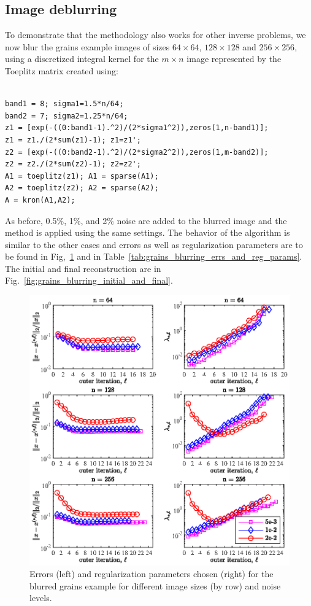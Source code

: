 \subsection{Image deblurring}
To demonstrate that the methodology also works for other inverse problems, we now blur the grains example images of sizes $64 \times 64$, $128 \times 128$ and $256 \times 256$, using a discretized integral kernel for the $m \times n$ image represented by the Toeplitz matrix created using:
\begin{verbatim}

band1 = 8; sigma1=1.5*n/64; 
band2 = 7; sigma2=1.25*n/64;
z1 = [exp(-((0:band1-1).^2)/(2*sigma1^2)),zeros(1,n-band1)];
z1 = z1./(2*sum(z1)-1); z1=z1';
z2 = [exp(-((0:band2-1).^2)/(2*sigma2^2)),zeros(1,m-band2)];
z2 = z2./(2*sum(z2)-1); z2=z2';
A1 = toeplitz(z1); A1 = sparse(A1); 
A2 = toeplitz(z2); A2 = sparse(A2);
A = kron(A1,A2);

\end{verbatim}
As before, 0.5\%, 1\%, and 2\% noise are added to the blurred image and the method is applied using the same settings. The behavior of the algorithm is similar to the other cases and errors as well as regularization parameters are to be found in Fig,~\ref{fig:grains_blurring_errs_and_reg_params} and in Table~\ref{tab:grains_blurring_errs_and_reg_params}. The initial and final reconstruction are in Fig.~\ref{fig:grains_blurring_initial_and_final}.
\begin{figure}[htbp]
\begin{center}
\includegraphics{figures/grains_blurring_errs_and_reg_params}
\caption{Errors (left) and regularization parameters chosen (right) for the blurred grains example for different image sizes (by row) and noise levels.}
\label{fig:grains_blurring_errs_and_reg_params}
\end{center}
\end{figure}
